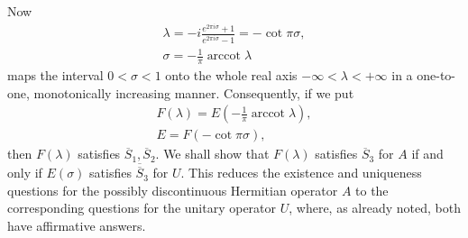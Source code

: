 \documentclass[fontsize=13pt,twoside,openany,headings=normal,parskip=false,bookmarkpackage=false,DIV=calc]{scrbook}
\begin{document}
\hypertarget{origpage-82}{}%
Now
\begin{gather*}
\lambda=-i\frac{e^{2\pi i\sigma}+1}{e^{2\pi i\sigma}-1}=-\cot\pi\sigma,\\
 \sigma=-\frac1\pi\operatorname{arccot}\lambda
\end{gather*}
maps the interval $0<\sigma<1$ onto the whole real axis $-\infty<\lambda<+\infty$ in a one-to-one, monotonically increasing manner. Consequently, if we put
\begin{equation}
\begin{gathered}
F(\lambda)=E\left(-\frac1\pi\operatorname{arccot}\lambda\right),\\
E=F(-\cot\pi\sigma),
\end{gathered}
\tag{C}\label{eq:II.9.C}
\end{equation}
then $F(\lambda)$ satisfies $\hyperref[cond:II.Sbar1]{\overline S_1},\hyperref[cond:II.Sbar2]{\overline S_2}$. We shall show that $F(\lambda)$ satisfies $\hyperref[cond:II.Sbar3]{\overline S_3}$ for $A$ if and only if $E(\sigma)$ satisfies $\hyperref[cond:II.Sdouble3]{\overline{\overline S}_3}$ for $U$. This reduces the existence and uniqueness questions for the possibly discontinuous Hermitian operator $A$ to the corresponding questions for the unitary operator $U$, where, as already noted, both have affirmative answers.
\end{document}
